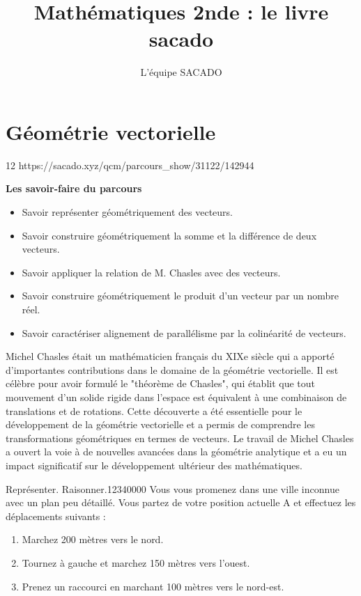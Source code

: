 



\title{Mathématiques 2nde  : le livre sacado}
\author{L'équipe SACADO}




\chapter{Géométrie vectorielle}{12}
{https://sacado.xyz/qcm/parcours_show/31122/142944}
{
 \begin{CpsCol}
	\textbf{Les savoir-faire du parcours}
 	\begin{itemize}
 		\item Savoir représenter géométriquement des vecteurs.
 		\item Savoir construire géométriquement la somme et la différence de deux vecteurs.
 		\item Savoir appliquer la relation de M. Chasles avec des vecteurs.
 		\item Savoir construire géométriquement le produit d'un vecteur par un nombre réel.
 		\item Savoir caractériser alignement de parallélisme par la colinéarité de vecteurs.
 	\end{itemize}
 \end{CpsCol}

\begin{His}
	Michel Chasles était un mathématicien français du XIXe siècle qui a apporté d'importantes contributions dans le domaine de la géométrie vectorielle. Il est célèbre pour avoir formulé le "théorème de Chasles", qui établit que tout mouvement d'un solide rigide dans l'espace est équivalent à une combinaison de translations et de rotations. Cette découverte a été essentielle pour le développement de la géométrie vectorielle et a permis de comprendre les transformations géométriques en termes de vecteurs. Le travail de Michel Chasles a ouvert la voie à de nouvelles avancées dans la géométrie analytique et a eu un impact significatif sur le développement ultérieur des mathématiques.
\end{His}

\begin{ExoDec}{Représenter. Raisonner.}{1234}{0}{0}{0}{0}
Vous vous promenez dans une ville inconnue avec un plan peu détaillé. Vous partez de votre position actuelle A et effectuez les déplacements suivants :
\begin{enumerate}
\item Marchez 200 mètres vers le nord.
\item Tournez à gauche et marchez 150 mètres vers l'ouest.
\item Prenez un raccourci en marchant 100 mètres vers le nord-est.
\end{enumerate}


\end{ExoDec}}
